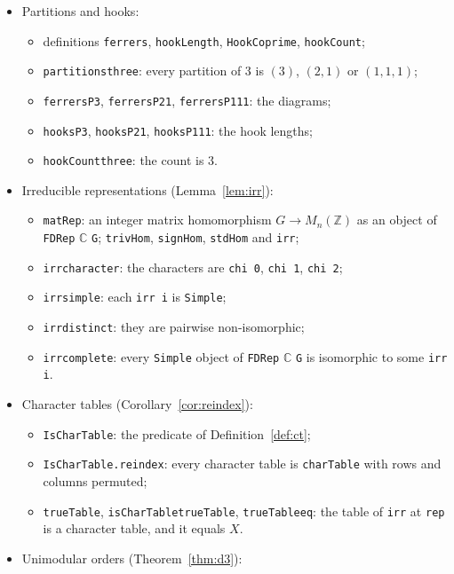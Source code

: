 \documentclass[11pt]{article}
\renewcommand{\_}{\oldus\allowbreak}
\theoremstyle{definition}
\theoremstyle{remark}
\begin{document}
\begin{itemize}
\item Partitions and hooks:
  \begin{itemize}
  \item definitions \texttt{ferrers}, \texttt{hookLength}, \texttt{HookCoprime}, \texttt{hookCount};
  \item \texttt{partitions\_three}: every partition of $3$ is $(3)$, $(2,1)$ or $(1,1,1)$;
  \item \texttt{ferrers\_P3}, \texttt{ferrers\_P21}, \texttt{ferrers\_P111}: the diagrams;
  \item \texttt{hooks\_P3}, \texttt{hooks\_P21}, \texttt{hooks\_P111}: the hook lengths;
  \item \texttt{hookCount\_three}: the count is $3$.
  \end{itemize}
\item Irreducible representations (Lemma~\ref{lem:irr}):
  \begin{itemize}
  \item \texttt{matRep}: an integer matrix homomorphism $G\to M_n(\mathbb Z)$ as an object of
  \texttt{FDRep} $\mathbb C$ \texttt{G}; \texttt{trivHom}, \texttt{signHom}, \texttt{stdHom} and \texttt{irr};
  \item \texttt{irr\_character}: the characters are \texttt{chi 0}, \texttt{chi 1}, \texttt{chi 2};
  \item \texttt{irr\_simple}: each \texttt{irr i} is \texttt{Simple};
  \item \texttt{irr\_distinct}: they are pairwise non-isomorphic;
  \item \texttt{irr\_complete}: every \texttt{Simple} object of \texttt{FDRep} $\mathbb C$ \texttt{G} is isomorphic to
  some \texttt{irr i}.
  \end{itemize}
\item Character tables (Corollary~\ref{cor:reindex}):
  \begin{itemize}
  \item \texttt{IsCharTable}: the predicate of Definition~\ref{def:ct};
  \item \texttt{IsCharTable.reindex}: every character table is \texttt{charTable} with rows and
  columns permuted;
  \item \texttt{trueTable}, \texttt{isCharTable\_trueTable}, \texttt{trueTable\_eq}: the table of
  \texttt{irr} at \texttt{rep} is a character table, and it equals $X$.
  \end{itemize}
\item Unimodular orders (Theorem~\ref{thm:d3}):

\end{itemize}
\end{document}
